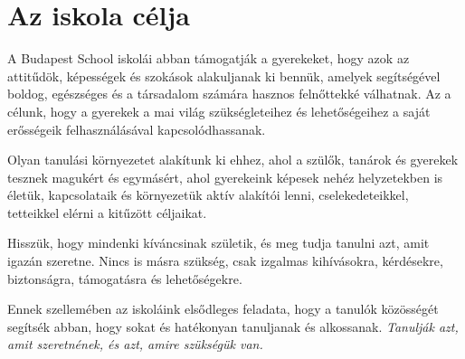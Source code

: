 \section{Az iskola célja}
\label{sec:iskola_celja}

A Budapest School iskolái abban támogatják a gyerekeket, hogy azok az
attitűdök, képességek és szokások alakuljanak ki bennük, amelyek segítségével
boldog, egészséges és a társadalom számára hasznos felnőttekké válhatnak. Az a
célunk, hogy a gyerekek a mai világ szükségleteihez és lehetőségeihez a saját
erősségeik felhasználásával kapcsolódhassanak.

Olyan tanulási környezetet alakítunk ki ehhez, ahol a szülők, tanárok és
gyerekek tesznek magukért és egymásért, ahol gyerekeink képesek nehéz
helyzetekben is életük, kapcsolataik és környezetük aktív alakítói lenni,
cselekedeteikkel, tetteikkel elérni a kitűzött céljaikat.

Hisszük, hogy mindenki kíváncsinak születik, és meg tudja tanulni azt, amit
igazán szeretne. Nincs is másra szükség, csak izgalmas kihívásokra, kérdésekre,
biztonságra, támogatásra és lehetőségekre.

Ennek szellemében az iskoláink elsődleges feladata, hogy a tanulók közösségét
segítsék abban, hogy sokat és hatékonyan tanuljanak és alkossanak.
\emph{Tanulják azt, amit szeretnének, és azt, amire szükségük van.}
